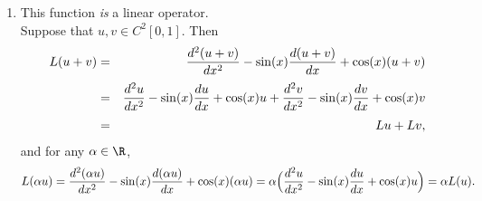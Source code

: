 {\begin{solution}
\begin{enumerate}
\item This function \emph{is} a linear operator.\\
      Suppose that $u, v \in C^2[0,1]$.  Then 
        \begin{eqnarray*}
               L(u+v) &=& {d^2(u+v) \over dx^2} - \sin(x) {d(u+v) \over dx} 
                           + \cos(x) (u+v)  \\[0.25em]
                  &=& {d^2 u \over dx^2} - \sin(x) {du \over dx} + \cos(x) u
                  + {d^2 v \over dx^2} - \sin(x) {dv \over dx} + \cos(x) v \\[0.25em]
                  &=& Lu + Lv,
        \end{eqnarray*}
      and for any $\alpha \in \R$,
        \[ L(\alpha u) = {d^2 (\alpha u) \over dx^2} - \sin(x) {d(\alpha u) \over dx} + \cos(x) (\alpha u) 
                       = \alpha \Big({d^2 u \over dx^2} - \sin(x) {du \over dx} + \cos(x) u\Big) = \alpha L(u).\]
\end{enumerate}
\end{solution}}{}

